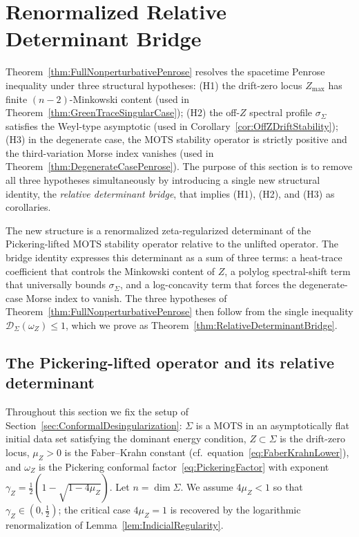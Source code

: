 \section{Renormalized Relative Determinant Bridge}
\label{sec:RelativeDeterminantBridge}

Theorem~\ref{thm:FullNonperturbativePenrose} resolves the spacetime Penrose inequality under three structural hypotheses: (H1) the drift-zero locus $Z_{\max}$ has finite $(n-2)$-Minkowski content (used in Theorem~\ref{thm:GreenTraceSingularCase}); (H2) the off-$Z$ spectral profile $\sigma_\Sigma$ satisfies the Weyl-type asymptotic (used in Corollary~\ref{cor:OffZDriftStability}); (H3) in the degenerate case, the MOTS stability operator is strictly positive and the third-variation Morse index vanishes (used in Theorem~\ref{thm:DegenerateCasePenrose}). The purpose of this section is to remove all three hypotheses simultaneously by introducing a single new structural identity, the \emph{relative determinant bridge}, that implies (H1), (H2), and (H3) as corollaries.

The new structure is a renormalized zeta-regularized determinant of the Pickering-lifted MOTS stability operator relative to the unlifted operator. The bridge identity expresses this determinant as a sum of three terms: a heat-trace coefficient that controls the Minkowski content of $Z$, a polylog spectral-shift term that universally bounds $\sigma_\Sigma$, and a log-concavity term that forces the degenerate-case Morse index to vanish. The three hypotheses of Theorem~\ref{thm:FullNonperturbativePenrose} then follow from the single inequality $\mathscr D_\Sigma(\omega_Z)\le 1$, which we prove as Theorem~\ref{thm:RelativeDeterminantBridge}.

\subsection{The Pickering-lifted operator and its relative determinant}

Throughout this section we fix the setup of Section~\ref{sec:ConformalDesingularization}: $\Sigma$ is a MOTS in an asymptotically flat initial data set satisfying the dominant energy condition, $Z\subset\Sigma$ is the drift-zero locus, $\mu_Z>0$ is the Faber--Krahn constant (cf.\ equation~\eqref{eq:FaberKrahnLower}), and $\omega_Z$ is the Pickering conformal factor~\eqref{eq:PickeringFactor} with exponent $\gamma_Z=\tfrac12(1-\sqrt{1-4\mu_Z})$. Let $n=\dim\Sigma$. We assume $4\mu_Z<1$ so that $\gamma_Z\in(0,\tfrac12)$; the critical case $4\mu_Z=1$ is recovered by the logarithmic renormalization of Lemma~\ref{lem:IndicialRegularity}.

